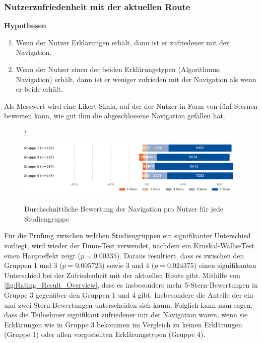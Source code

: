 \subsubsection{Nutzerzufriedenheit mit der aktuellen Route}

\textbf{Hypothesen}

\begin{enumerate}
    \item Wenn der Nutzer Erklärungen erhält, dann ist er zufriedener mit der Navigation.
    \item Wenn der Nutzer einen der beiden Erklärungstypen (Algorithmus, Navigation) erhält, dann ist er weniger zufrieden mit der Navigation als wenn er beide erhält.
\end{enumerate}

Als Messwert wird eine Likert-Skala, auf der der Nutzer in Form von fünf Sternen bewerten kann, wie gut ihm die abgeschlossene Navigation gefallen hat. 

\begin{figure}[bth]!
    \includegraphics[width=\linewidth]{contents/06_model_evaluation/res/Rating_Result_Overview.pdf}
    \caption{Durchschnittliche Bewertung der Navigation pro Nutzer für jede Studiengruppe}
    \label{fig:Rating_Result_Overview}
\end{figure}

Für die Prüfung zwischen welchen Studiengruppen ein signifikanter Unterschied vorliegt, wird wieder der Dunn-Test \cite{dunn1964multiple} verwendet, nachdem ein Kruskal-Wallis-Test einen Haupteffekt zeigt ($ p = 0.00335 $). Daraus resultiert, dass es zwischen den Gruppen 1 und 3 ($ p = 0.005723$) sowie 3 und 4 ($ p = 0.024375 $) einen signifikanten Unterschied bei der Zufriedenheit mit der aktuellen Route gibt. Mithilfe von \autoref{fig:Rating_Result_Overview}, dass es insbesondere mehr 5-Stern-Bewertungen in Gruppe 3 gegenüber den Gruppen 1 und 4 gibt. Insbesondere die Anteile der ein und zwei Stern Bewertungen unterscheiden sich kaum. Folglich kann man sagen, dass die Teilnehmer signifikant zufriedener mit der Navigation waren, wenn sie Erklärungen wie in Gruppe 3 bekommen im Vergleich zu keinen Erklärungen (Gruppe 1) oder allen vorgestellten Erklärungstypen (Gruppe 4).

